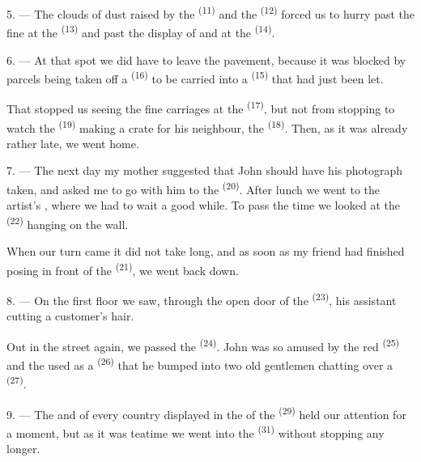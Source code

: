 5. --- The clouds of dust raised by the  \textsuperscript{(11)} and
the  \textsuperscript{(12)} forced us to hurry past the fine
 at the
 \textsuperscript{(13)} and past the display of
 and  at the  \textsuperscript{(14)}.

6. --- At that spot we did have to leave the pavement, because it was blocked by parcels being
taken off a  \textsuperscript{(16)} to be carried into a 
\textsuperscript{(15)} that had just been let.

That stopped us seeing the fine carriages at the
 \textsuperscript{(17)}, but not from stopping to watch the
 \textsuperscript{(19)} making a crate for his neighbour, the
 \textsuperscript{(18)}. Then, as it was already rather
late, we went home.

\VUsaut{3.0mm}

7. --- The next day my mother suggested that John should have his photograph taken, and asked
me to go with him to the
 \textsuperscript{(20)}. After lunch we went to the artist's
, where we had to wait a good while. To pass the time we
looked at the  \textsuperscript{(22)} hanging on the wall.

When our turn came it did not take long, and as soon as my friend had finished posing in front
of the  \textsuperscript{(21)}, we went back down.

8. --- On the first floor we saw, through the open door of the
 \textsuperscript{(23)}, his assistant cutting a customer's hair.

Out in the street again, we passed the  \textsuperscript{(24)}. John was
so amused by the red  \textsuperscript{(25)} and the
 used as a  \textsuperscript{(26)} that he bumped into two
old gentlemen chatting over a  \textsuperscript{(27)}.

\VUsaut{3.0mm}

9. --- The  and  of every country displayed in the
 of the  \textsuperscript{(29)} held our attention for
a moment, but as it was teatime we went into the
 \textsuperscript{(31)} without stopping any longer.

